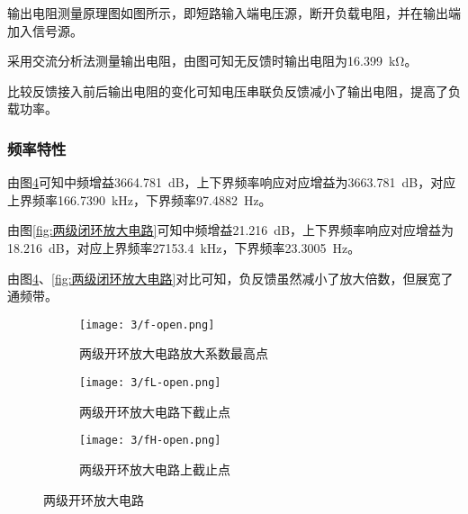 输出电阻测量原理图如图所示，即短路输入端电压源，断开负载电阻，并在输出端加入信号源。

采用交流分析法测量输出电阻，由图可知无反馈时输出电阻为\SI{16.399}{\kohm}。

比较反馈接入前后输出电阻的变化可知电压串联负反馈减小了输出电阻，提高了负载功率。

\subsubsection{频率特性}%
\label{ssub:频率特性}

由图\ref{fig:两级开环放大电路}可知中频增益\SI{3664.781}{\dB}，上下界频率响应对应增益为\SI{3663.781}{\dB}，对应上界频率\SI{166.7390}{\kHz}，下界频率\SI{97.4882}{\Hz}。

由图\ref{fig:两级闭环放大电路}可知中频增益\SI{21.216}{\dB}，上下界频率响应对应增益为\SI{18.216}{\dB}，对应上界频率\SI{27153.4}{\kHz}，下界频率\SI{23.3005}{\Hz}。

由图\ref{fig:两级开环放大电路}、\ref{fig:两级闭环放大电路}对比可知，负反馈虽然减小了放大倍数，但展宽了通频带。

\begin{figure}[H]
	\centering
	\begin{subfigure}[H]{.8\linewidth}
		\centering
		\texttt{[image: 3/f-open.png]}
		\caption{两级开环放大电路放大系数最高点}
		\label{fig:两级开环放大电路放大系数最高点}
	\end{subfigure}
	\quad
	\begin{subfigure}[H]{.8\linewidth}
		\centering
		\texttt{[image: 3/fL-open.png]}
		\caption{两级开环放大电路下截止点}
		\label{fig:两级开环放大电路下截止点}
	\end{subfigure}
	\quad
	\begin{subfigure}[H]{.8\linewidth}
		\centering
		\texttt{[image: 3/fH-open.png]}
		\caption{两级开环放大电路上截止点}
		\label{fig:两级开环放大电路上截止点}
	\end{subfigure}
	\caption{两级开环放大电路}
	\label{fig:两级开环放大电路}
\end{figure}

